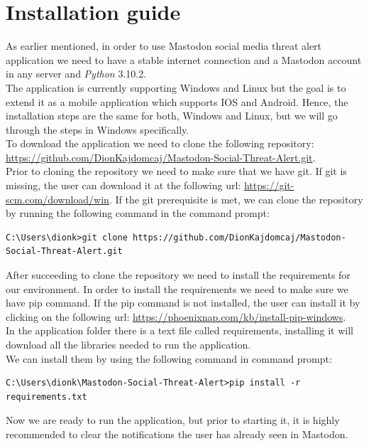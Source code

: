\section{Installation guide}
\label{s:installation_guide}
As earlier mentioned, in order to use Mastodon social media threat alert application
we need to have a stable internet connection and a Mastodon account in any server and \textit{Python} 3.10.2.
\\[5pt]
The application is currently supporting Windows and Linux but the goal is to extend it as a 
mobile application which supports IOS and Android. Hence, the installation steps are the same for
both, Windows and Linux, but we will go through the steps in Windows specifically.
\\[5pt]
To download the application we need to clone the following repository: 
\url{https://github.com/DionKajdomcaj/Mastodon-Social-Threat-Alert.git}.
\\[5pt]
Prior to cloning the repository we need to make sure that we have git.
If git is missing, the user can download it at the
following url: \url{https://git-scm.com/download/win}.
If the git prerequisite is met, we can clone the repository by
running the following command in the command prompt:
\\[5pt]
\begin{lstlisting}[caption=Cloning Repository, captionpos=b]
	C:\Users\dionk>git clone https://github.com/DionKajdomcaj/Mastodon-Social-Threat-Alert.git
\end{lstlisting}
After succeeding to clone the repository we need to install the requirements for
our environment. In order to install the requirements we need to make sure we have
pip command. If the pip command is not installed, the user can install it by clicking
on the following url: \url{https://phoenixnap.com/kb/install-pip-windows}.
\\[5pt]
In the application folder there is a text file called requirements, installing it
will download all the libraries needed to run the application.
\\[5pt]
We can install them by using the following command in command prompt:
\\[5pt]
\begin{lstlisting}[caption=Installing requirements, captionpos=b]
	C:\Users\dionk\Mastodon-Social-Threat-Alert>pip install -r requirements.txt
\end{lstlisting}
Now we are ready to run the application, but prior to starting it,
it is highly recommended to clear the notifications the user has already
seen in Mastodon.
